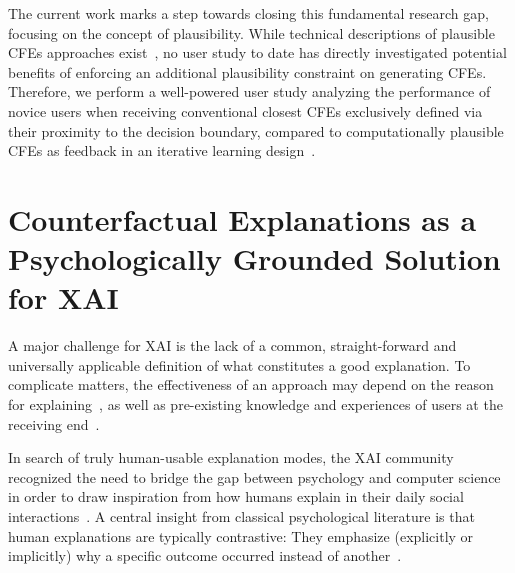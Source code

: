 The current work marks a step towards closing this fundamental research gap, focusing on the concept of plausibility.
While technical descriptions of plausible \glspl{CFE} approaches exist~\citep{smyth_few_2021,schleich_geco_2021,artelt_efficient_2022}, no user study to date has directly investigated potential benefits of enforcing an additional plausibility constraint on generating \glspl{CFE}.
Therefore, we perform a well-powered user study analyzing the performance of novice users when receiving conventional closest \glspl{CFE} exclusively defined via their proximity to the decision boundary, compared to computationally plausible \glspl{CFE} as feedback in an iterative learning design~\citep{artelt_convex_2020, artelt_efficient_2022}.

\section{Counterfactual Explanations as a Psychologically Grounded Solution for XAI}\label{subsec:psychoCFs}

A major challenge for \gls{XAI} is the lack of a common, straight-forward and universally applicable definition of what constitutes a good explanation.
To complicate matters, the effectiveness of an approach may depend on the reason for explaining~\citep{adadi_peeking_2018}, as well as pre-existing knowledge and experiences of users at the receiving end~\citep{van_der_waa_evaluating_2021}.

In search of truly human-usable explanation modes, the \gls{XAI} community recognized the need to bridge the gap between psychology and computer science in order to draw inspiration from how humans explain in their daily social interactions~\citep{miller_explanation_2019}.
A central insight from classical psychological literature is that human explanations are typically contrastive: They emphasize (explicitly or implicitly) why a specific outcome occurred instead of another~\citep{miller_explanation_2019, lipton_contrastive_1990, lombrozo_explanation_2012, hilton_knowledge-based_1986}.

